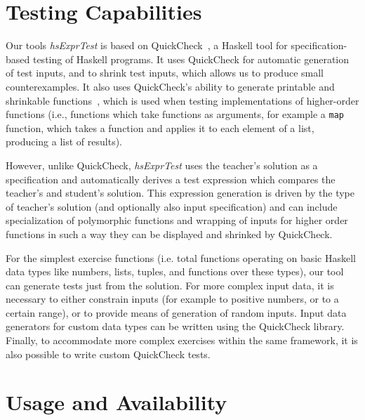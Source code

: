 \documentclass[sigconf,screen]{acmart} %
\newcommand{\hsExprTest}{\textit{hsExprTest}}
\begin{document}

\maketitle

\section{Testing Capabilities}

Our tools \hsExprTest{} is based on QuickCheck~\cite{Koen2000}, a Haskell tool for
specification-based testing of Haskell programs.
It uses QuickCheck for automatic generation of test inputs, and to shrink test
inputs, which allows us to produce small counterexamples.
It also uses QuickCheck's ability to generate printable and shrinkable
functions~\cite{Koen2012}, which is used when testing implementations of
higher-order functions (i.e., functions which take functions as arguments, for
example a \texttt{map} function, which takes a function and applies it to each
element of a list, producing a list of results).

However, unlike QuickCheck, \hsExprTest{} uses the teacher's solution as a
specification and automatically derives a test expression which compares the
teacher's and student's solution.
This expression generation is driven by the type of teacher's solution (and
optionally also input specification) and can include specialization of
polymorphic functions and wrapping of inputs for higher order functions in such
a way they can be displayed and shrinked by QuickCheck.

For the simplest exercise functions (i.e. total functions operating on basic
Haskell data types like numbers, lists, tuples, and functions over these
types), our tool can generate tests just from the solution.
For more complex input data, it is necessary to either constrain inputs
(for example to positive numbers, or to a certain range), or to provide means
of generation of random inputs.
Input data generators for custom data types can be written using the QuickCheck
library.
Finally, to accommodate more complex exercises within the same framework, it is
also possible to write custom QuickCheck tests.

\section{Usage and Availability}
\end{document}
